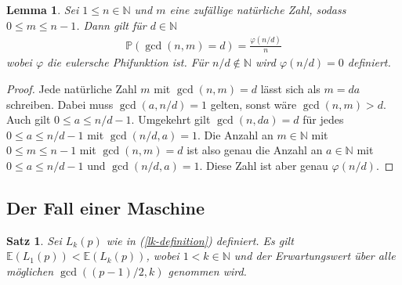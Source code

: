 \documentclass[a4paper, 10pt, ngerman]{article}
\newcommand{\E}{\mathbb{E}}
\newcommand{\N}{\mathbb{N}}
\newtheorem{theorem}{Satz}
\newtheorem{lemma}{Lemma}
\begin{document}
\begin{lemma}\label{lemma-gcd-probability}
    Sei $1 \le n \in \N$ und $m$ eine zufällige natürliche Zahl, sodass $0 \le m \le n - 1$. Dann gilt für $d \in \N$
    \begin{align*}
        \mathbb{P}(\gcd(n, m) = d) = \frac {\varphi(n / d)} n
    \end{align*}
    wobei $\varphi$ die eulersche Phifunktion ist. Für $n/d \notin \N$ wird $\varphi(n/d) = 0$ definiert.
\end{lemma}

\begin{proof}
    Jede natürliche Zahl $m$ mit $\gcd(n, m) = d$ lässt sich als $m = da$ schreiben. Dabei muss $\gcd(a, n / d) = 1$ gelten, sonst wäre $\gcd(n, m) > d$. Auch gilt $0 \le a \le n/d - 1$. Umgekehrt gilt $\gcd(n, da) = d$ für jedes $0 \le a \le n/d - 1$ mit $\gcd(n/d, a) = 1$. Die Anzahl an $m \in \N$ mit $0 \le m \le n - 1$ mit $\gcd(n, m) = d$ ist also genau die Anzahl an $a \in \N$ mit $0 \le a \le  n / d - 1$ und $\gcd(n / d, a) = 1$. Diese Zahl ist aber genau $\varphi(n/d)$.
\end{proof}

\subsection{Der Fall einer Maschine}

\begin{theorem}
    Sei $L_k(p)$ wie in (\ref{lk-definition}) definiert. Es gilt $\E(L_1(p)) < \E(L_k(p))$, wobei $1 < k \in \N$ und der Erwartungswert über alle möglichen $\gcd((p - 1)/2, k)$ genommen wird.
\end{theorem}
\end{document}
